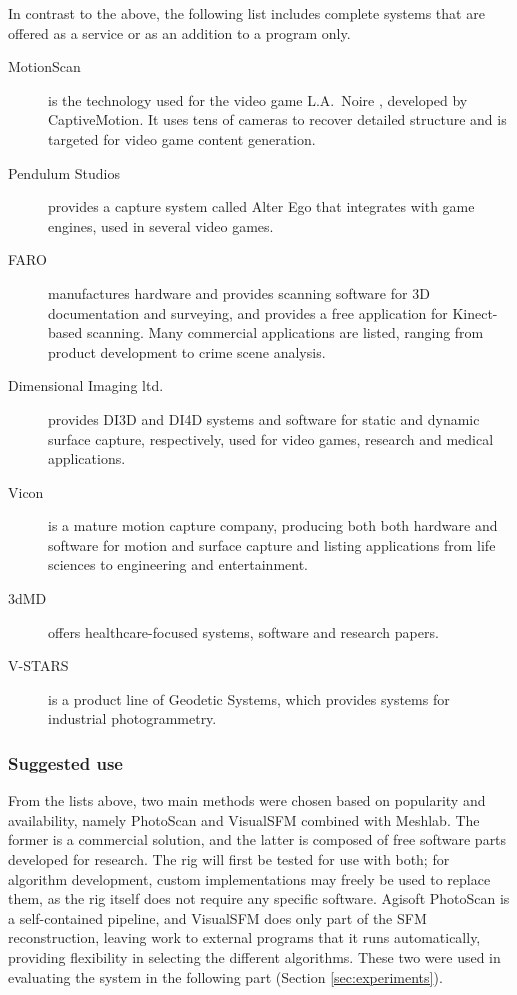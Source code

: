 In contrast to the above, the following list includes complete systems that are offered as a service or as an addition to a program only.

\begin{description}
	\item[MotionScan] is the technology used for the video game L.A.\ Noire \cite{rockstar2011noire}, developed by CaptiveMotion.
		It uses tens of cameras to recover detailed structure and is targeted for video game content generation.

	\item[Pendulum Studios] \cite{alterego} provides a capture system called Alter Ego that integrates with game engines, used in several video games.

	\item [FARO] \cite{faro} manufactures hardware and provides scanning software for 3D documentation and surveying, and provides a free application for Kinect-based scanning.
		Many commercial applications are listed, ranging from product development to crime scene analysis.

	\item[Dimensional Imaging ltd.] \cite{di4d} provides DI3D and DI4D systems and software for static and dynamic surface capture, respectively, used for video games, research and medical applications.

	\item[Vicon] \cite{vicon} is a mature motion capture company, producing both both hardware and software for motion and surface capture and listing applications from life sciences to engineering and entertainment.

	\item[3dMD] \cite{3dmd} offers healthcare-focused systems, software and research papers.

	\item[V-STARS] \cite{vstars} is a product line of Geodetic Systems, which provides systems for industrial photogrammetry.
\end{description}

\subsubsection{Suggested use} %

From the lists above, two main methods were chosen based on popularity and availability, namely PhotoScan and VisualSFM combined with Meshlab.
The former is a commercial solution, and the latter is composed of free software parts developed for research.
The rig will first be tested for use with both; for algorithm development, custom implementations may freely be used to replace them, as the rig itself does not require any specific software.
Agisoft PhotoScan is a self-contained pipeline, and VisualSFM does only part of the SFM reconstruction, leaving work to external programs that it runs automatically, providing flexibility in selecting the different algorithms.
These two were used in evaluating the system in the following part (Section \ref{sec:experiments}).

